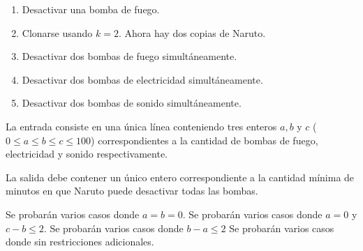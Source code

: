 \documentclass{oci}
\begin{document}
\begin{problemDescription}
\begin{enumerate}
\item Desactivar una bomba de fuego.
\item Clonarse usando $k = 2$. Ahora hay dos copias de Naruto.
\item Desactivar dos bombas de fuego simultáneamente.
\item Desactivar dos bombas de electricidad simultáneamente.
\item Desactivar dos bombas de sonido simultáneamente.
\end{enumerate}

\end{problemDescription}

\begin{inputDescription}
  La entrada consiste en una única línea conteniendo tres enteros $a, b$ y $c$
  ($0\leq a \leq b \leq c \leq 100$) correspondientes a la cantidad de bombas de fuego,
  electricidad y sonido respectivamente.
\end{inputDescription}

\begin{outputDescription}
  La salida debe contener un único entero correspondiente a la cantidad mínima
  de minutos en que Naruto puede desactivar todas las bombas.
\end{outputDescription}

\begin{scoreDescription}
   Se probarán varios casos donde $a = b = 0$.
   Se probarán varios casos donde $a = 0$ y $c - b \leq 2$.
   Se probarán varios casos donde $b - a \leq 2$
   Se probarán varios casos donde sin restricciones adicionales.
\end{scoreDescription}

\begin{sampleDescription}
\end{sampleDescription}
\end{document}
